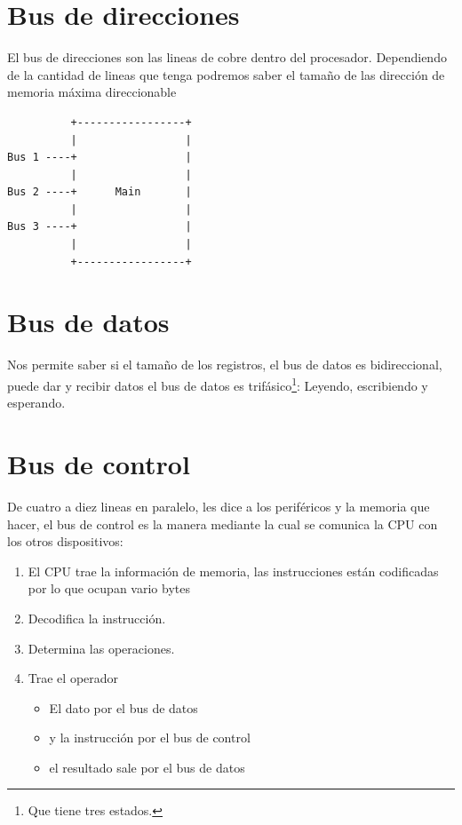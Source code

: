 \documentclass[12pt]{article}
\begin{document}
\section*{Bus de direcciones}
\label{sec:org6b91c20}
El bus de direcciones son las lineas de cobre dentro del procesador. Dependiendo de la cantidad de lineas que tenga podremos saber el tamaño de las dirección de memoria máxima direccionable 

\begin{verbatim}
          +-----------------+
          |                 |
Bus 1 ----+                 |
          |                 |
Bus 2 ----+      Main       |
          |                 |
Bus 3 ----+                 |
          |                 | 
          +-----------------+
\end{verbatim}


\section*{Bus de datos}
\label{sec:org1d454c0}
Nos permite saber si el tamaño de los registros, el bus de datos es bidireccional, puede dar y recibir datos el bus de datos es trifásico\footnote{Que tiene tres estados.}:  Leyendo, escribiendo y esperando.


\section*{Bus de control}
\label{sec:orgf58e8e4}
De cuatro a diez lineas en paralelo, les dice a los periféricos y la memoria que hacer, el bus de control es la manera mediante la cual se comunica la CPU con los otros dispositivos:

\begin{mdframed}
\begin{enumerate}
\item El CPU trae la información de memoria, las instrucciones están codificadas por lo que ocupan vario bytes
\item Decodifica la instrucción.
\item Determina las operaciones.
\item Trae el operador
\begin{itemize}
\item El dato por  el bus de datos
\item y la instrucción por el bus de control
\item el resultado sale por el bus de datos
\end{itemize}
\end{enumerate}
\end{mdframed}
\end{document}
